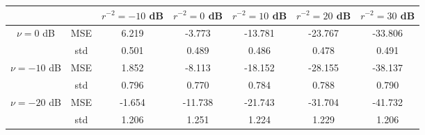 \begin{tabular}{ccccccc}
\toprule
             &     &  $r^{-2}=-10$ dB &  $r^{-2}=0$ dB &  $r^{-2}=10$ dB &  $r^{-2}=20$ dB &  $r^{-2}=30$ dB \\
\midrule
$\nu=0$ dB & MSE &            6.219 &         -3.773 &         -13.781 &         -23.767 &         -33.806 \\
             & std &            0.501 &          0.489 &           0.486 &           0.478 &           0.491 \\ \hline
$\nu=-10$ dB & MSE &            1.852 &         -8.113 &         -18.152 &         -28.155 &         -38.137 \\
             & std &            0.796 &          0.770 &           0.784 &           0.788 &           0.790 \\ \hline
$\nu=-20$ dB & MSE &           -1.654 &        -11.738 &         -21.743 &         -31.704 &         -41.732 \\
             & std &            1.206 &          1.251 &           1.224 &           1.229 &           1.206 \\
\bottomrule
\end{tabular}

